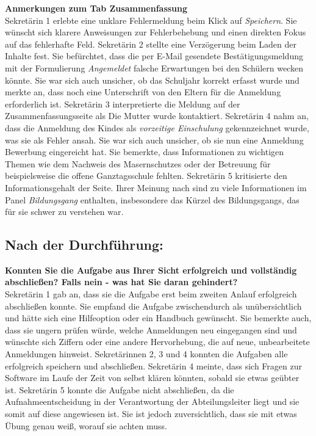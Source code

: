\textbf{Anmerkungen zum Tab \glqq Zusammenfassung\grqq{}}\\
Sekretärin 1 erlebte eine unklare Fehlermeldung beim Klick auf \textit{Speichern}. Sie wünscht sich klarere Anweisungen zur Fehlerbehebung und einen direkten Fokus auf das fehlerhafte Feld.
Sekretärin 2 stellte eine Verzögerung beim Laden der Inhalte fest. Sie befürchtet, dass die per E-Mail gesendete Bestätigungsmeldung mit der Formulierung \textit{Angemeldet} falsche Erwartungen bei den Schülern wecken könnte. Sie war sich auch unsicher, ob das Schuljahr korrekt erfasst wurde und merkte an, dass noch eine Unterschrift von den Eltern für die Anmeldung erforderlich ist.
Sekretärin 3 interpretierte die Meldung auf der Zusammenfassungsseite als \glqq Die Mutter wurde kontaktiert\grqq{}.
Sekretärin 4 nahm an, dass die Anmeldung des Kindes als \textit{vorzeitige Einschulung} gekennzeichnet wurde, was sie als Fehler ansah. Sie war sich auch unsicher, ob sie nun eine \glqq Anmeldung Bewerbung\grqq{} eingereicht hat. Sie bemerkte, dass Informationen zu wichtigen Themen wie dem Nachweis des Masernschutzes oder der Betreuung für beispielsweise die offene Ganztagsschule fehlten.
Sekretärin 5 kritisierte den Informationsgehalt der Seite. Ihrer Meinung nach sind zu viele Informationen im Panel \textit{Bildungsgang} enthalten, insbesondere das Kürzel des Bildungsgangs, das für sie schwer zu verstehen war.

\subsection{Nach der Durchführung:}

\textbf{Konnten Sie die Aufgabe aus Ihrer Sicht erfolgreich und vollständig abschließen? Falls nein - was hat Sie daran gehindert?}\\
Sekretärin 1 gab an, dass sie die Aufgabe erst beim zweiten Anlauf erfolgreich abschließen konnte. Sie empfand die Aufgabe zwischendurch als unübersichtlich und hätte sich eine Hilfeoption oder ein Handbuch gewünscht. Sie bemerkte auch, dass sie ungern prüfen würde, welche Anmeldungen neu eingegangen sind und wünschte sich Ziffern oder eine andere Hervorhebung, die auf neue, unbearbeitete Anmeldungen hinweist.
Sekretärinnen 2, 3 und 4 konnten die Aufgaben alle erfolgreich speichern und abschließen. Sekretärin 4 meinte, dass sich Fragen zur Software im Laufe der Zeit von selbst klären könnten, sobald sie etwas geübter ist.
Sekretärin 5 konnte die Aufgabe nicht abschließen, da die Aufnahmeentscheidung in der Verantwortung der Abteilungsleiter liegt und sie somit auf diese angewiesen ist. Sie ist jedoch zuversichtlich, dass sie mit etwas Übung genau weiß, worauf sie achten muss.

